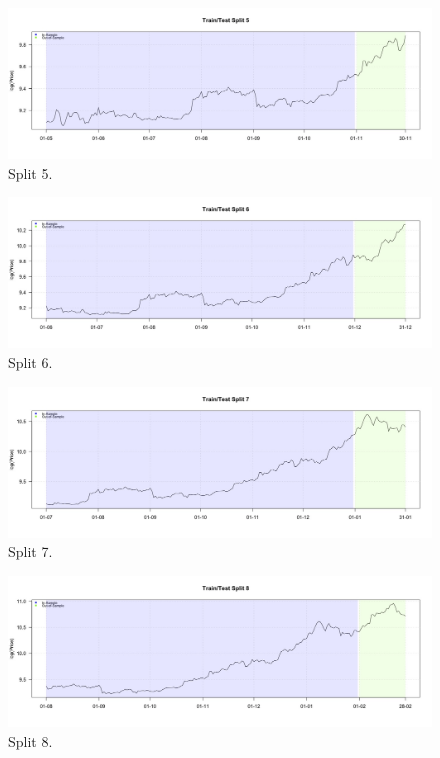 \documentclass[
]{article}
\begin{document}
\begin{figure}

{\centering \includegraphics[width=0.9\linewidth]{images/splitplots/price5} 

}

\caption{Split 5.}\label{fig:price5}
\end{figure}

\begin{figure}

{\centering \includegraphics[width=0.9\linewidth]{images/splitplots/price6} 

}

\caption{Split 6.}\label{fig:price6}
\end{figure}

\begin{figure}

{\centering \includegraphics[width=0.9\linewidth]{images/splitplots/price7} 

}

\caption{Split 7.}\label{fig:price7}
\end{figure}

\begin{figure}

{\centering \includegraphics[width=0.9\linewidth]{images/splitplots/price8} 

}

\caption{Split 8.}\label{fig:price8}
\end{figure}
\end{document}
